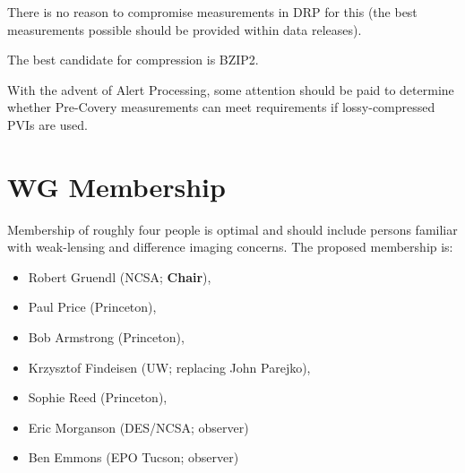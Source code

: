 There is no reason to compromise measurements in DRP for this (the best measurements possible should be provided within data releases). 

The best candidate for compression is BZIP2.

With the advent of Alert Processing, some attention should be paid to determine whether Pre-Covery measurements can meet requirements if lossy-compressed PVIs are used.



\section{WG Membership}

Membership of roughly four people is optimal and should include persons familiar 
with weak-lensing and difference imaging concerns.
The proposed membership is:

\begin{itemize}
    \item Robert Gruendl (NCSA; \textbf{Chair}),
    \item Paul Price (Princeton),
    \item Bob Armstrong (Princeton),
    \item Krzysztof Findeisen (UW; replacing John Parejko),
    \item Sophie Reed (Princeton),
    \item Eric Morganson (DES/NCSA; observer)
    \item Ben Emmons (EPO Tucson; observer)
\end{itemize}

